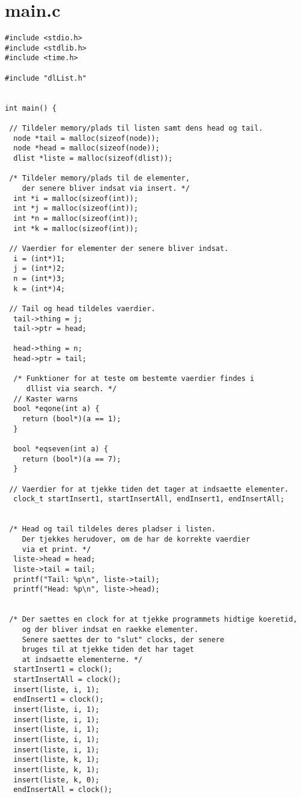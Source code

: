 \documentclass[a4paper,12pt]{article}
\begin{document}
\section*{main.c}
\begin{lstlisting}
#include <stdio.h>
#include <stdlib.h>
#include <time.h>

#include "dlList.h"


int main() {

 // Tildeler memory/plads til listen samt dens head og tail.
  node *tail = malloc(sizeof(node));
  node *head = malloc(sizeof(node));
  dlist *liste = malloc(sizeof(dlist));

 /* Tildeler memory/plads til de elementer, 
    der senere bliver indsat via insert. */
  int *i = malloc(sizeof(int));
  int *j = malloc(sizeof(int));
  int *n = malloc(sizeof(int));
  int *k = malloc(sizeof(int));

 // Vaerdier for elementer der senere bliver indsat.
  i = (int*)1;
  j = (int*)2;
  n = (int*)3;
  k = (int*)4;

 // Tail og head tildeles vaerdier.
  tail->thing = j;
  tail->ptr = head;

  head->thing = n;
  head->ptr = tail;

  /* Funktioner for at teste om bestemte vaerdier findes i 
     dllist via search. */
  // Kaster warns
  bool *eqone(int a) {
    return (bool*)(a == 1);
  }

  bool *eqseven(int a) {
    return (bool*)(a == 7);
  }

 // Vaerdier for at tjekke tiden det tager at indsaette elementer.
  clock_t startInsert1, startInsertAll, endInsert1, endInsertAll;


 /* Head og tail tildeles deres pladser i listen.
    Der tjekkes herudover, om de har de korrekte vaerdier 
    via et print. */
  liste->head = head;
  liste->tail = tail;
  printf("Tail: %p\n", liste->tail);
  printf("Head: %p\n", liste->head);


 /* Der saettes en clock for at tjekke programmets hidtige koeretid,
    og der bliver indsat en raekke elementer.
    Senere saettes der to "slut" clocks, der senere 
    bruges til at tjekke tiden det har taget
    at indsaette elementerne. */
  startInsert1 = clock();
  startInsertAll = clock();
  insert(liste, i, 1);
  endInsert1 = clock();
  insert(liste, i, 1);
  insert(liste, i, 1);
  insert(liste, i, 1);
  insert(liste, i, 1);
  insert(liste, i, 1);
  insert(liste, k, 1);
  insert(liste, k, 1);
  insert(liste, k, 0);
  endInsertAll = clock();



\end{lstlisting}
\end{document}
